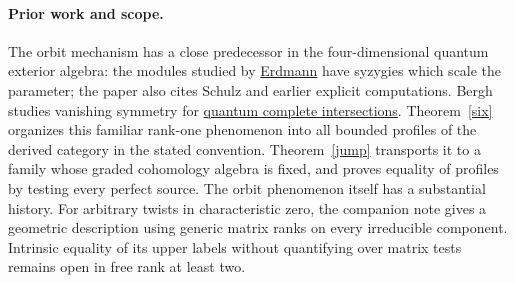 \documentclass[11pt]{article}
\begin{document}
\paragraph{Prior work and scope.}
The orbit mechanism has a close predecessor in the four-dimensional
quantum exterior algebra: the modules studied by
\href{https://www.cambridge.org/core/services/aop-cambridge-core/content/view/26516CA33D32E5B50A8C291AEE0EB145/S1446788716000331a.pdf/ext-finite-modules-for-weakly-symmetric-algebras-with-radical-cube-zero.pdf}{Erdmann}
have syzygies which scale the parameter; the paper also cites Schulz
and earlier explicit computations. Bergh studies vanishing symmetry
for \href{https://arxiv.org/abs/0811.4309}{quantum complete intersections}.
Theorem~\ref{six} organizes this familiar rank-one phenomenon into all
bounded profiles of the derived category in the stated convention.
Theorem~\ref{jump} transports it to a family whose graded cohomology
algebra is fixed, and proves equality of profiles by testing every
perfect source. The orbit phenomenon itself has a substantial history.
For arbitrary twists in characteristic zero, the companion note
gives a geometric description using generic matrix ranks on every
irreducible component. Intrinsic equality of its upper labels without
quantifying over matrix tests remains open in free rank at least two.
\end{document}
